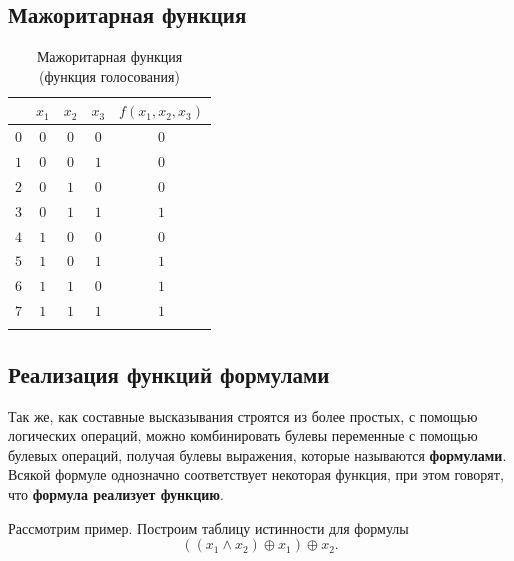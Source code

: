 \documentclass[a5paper, 11pt]{extarticle}
\theoremstyle{definition}
\theoremstyle{definition}
\theoremstyle{definition}
\numberwithin{figure}{section}
\numberwithin{table}{section}
\begin{document}
\subsection{Мажоритарная функция}

\begin{table}[H]
    \renewcommand*{\arraystretch}{1.5}
    \begin{longtable}{|c|c|c|c|c|}
        \hline
              & \(x_1\) & \(x_2\) & \(x_3\) & \(f(x_1, x_2, x_3)\) \\
        \hline
        \(0\) & \(0\)   & \(0\)   & \(0\)   & \(0\)                \\
        \hline
        \(1\) & \(0\)   & \(0\)   & \(1\)   & \(0\)                \\
        \hline
        \(2\) & \(0\)   & \(1\)   & \(0\)   & \(0\)                \\
        \hline
        \(3\) & \(0\)   & \(1\)   & \(1\)   & \(1\)                \\
        \hline
        \(4\) & \(1\)   & \(0\)   & \(0\)   & \(0\)                \\
        \hline
        \(5\) & \(1\)   & \(0\)   & \(1\)   & \(1\)                \\
        \hline
        \(6\) & \(1\)   & \(1\)   & \(0\)   & \(1\)                \\
        \hline
        \(7\) & \(1\)   & \(1\)   & \(1\)   & \(1\)                \\
        \hline
        \caption{Мажоритарная функция (функция голосования)}
    \end{longtable}
\end{table}

\subsection{Реализация функций формулами}

Так же, как составные высказывания строятся из более простых, с помощью логических операций, можно комбинировать булевы переменные с помощью булевых операций, получая булевы выражения, которые называются \textbf{формулами}. Всякой формуле однозначно соответствует некоторая функция, при этом говорят, что \textbf{формула реализует функцию}.

Рассмотрим пример. Построим таблицу истинности для формулы
\[
    ((x_1 \land x_2) \oplus x_1) \oplus x_2.
\]
\end{document}
